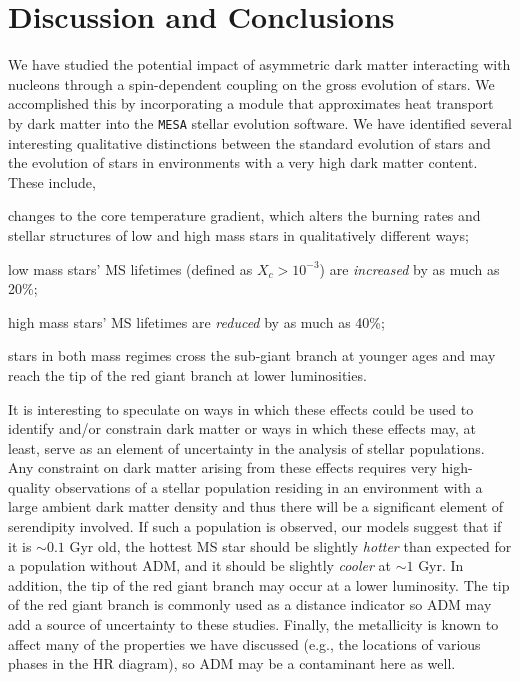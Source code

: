 \documentclass[useAMS,usenatbib]{mnras}
\begin{document}
\section{Discussion and Conclusions}
\label{sec:discus}


We have studied the potential impact of asymmetric dark matter interacting 
with nucleons through a spin-dependent coupling on the gross evolution 
of stars. We accomplished this by incorporating a module that approximates 
heat transport by dark matter into the {\tt MESA} stellar evolution 
software. We have identified several interesting qualitative distinctions between the standard evolution of stars and the evolution of stars in 
environments with a very high dark matter content. These include,
\begin{inparaenum}[1)]
\item changes to the core temperature gradient, which alters the burning rates and stellar structures of low and high mass stars in qualitatively different ways;
\item low mass stars' MS lifetimes (defined as $X_c > 10^{-3}$) are \emph{increased} by as much as 20\%;
\item high mass stars' MS lifetimes are \emph{reduced} by as much as 40\%;
\item stars in both mass regimes cross the sub-giant branch at younger ages and may reach the tip of the red giant branch at lower luminosities.
\end{inparaenum}

It is interesting to speculate on ways in which these effects could be 
used to identify and/or constrain dark matter or ways in which these 
effects may, at least, serve as an element of uncertainty in the analysis 
of stellar populations. Any constraint on dark matter arising from these 
effects requires very high-quality observations of a stellar population 
residing in an environment with a large ambient dark matter density and thus there will be a significant element of serendipity involved. 
If such a population is observed, our models suggest that if it is $\sim 0.1$ Gyr old, the hottest MS star should be slightly \emph{hotter} than expected for a population without ADM, and it should be slightly \emph{cooler} at $\sim 1$ Gyr. In addition, the tip of the red giant branch may occur at a lower luminosity. The tip of the red giant branch is commonly used as a distance indicator
so ADM may add a source of uncertainty to these studies.
Finally, the metallicity is known to affect many of the properties we have discussed (e.g., the locations of various phases in the HR diagram), so ADM may be a contaminant here as well.
\end{document}
